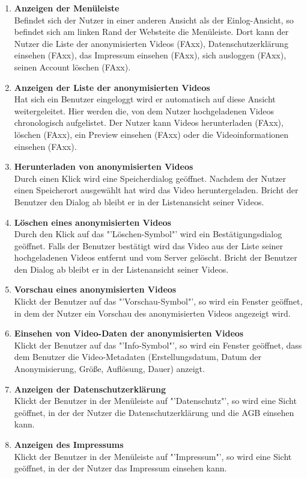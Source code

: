 \begin{enumerate}[\bfseries{FA}10]
\item \textbf{Anzeigen der Menüleiste} \hfill \\
Befindet sich der Nutzer in einer anderen Ansicht als der Einlog-Ansicht, so befindet sich am linken Rand der Websteite die Menüleiste. Dort kann der Nutzer die Liste der anonymisierten Videos (FAxx), Datenschutzerklärung einsehen (FAxx), das Impressum einsehen (FAxx), sich ausloggen (FAxx), seinen Account löschen (FAxx).

\item \textbf{Anzeigen der Liste der anonymisierten Videos} \hfill \\
Hat sich ein Benutzer eingeloggt wird er automatisch auf diese Ansicht weitergeleitet. Hier werden die, von dem Nutzer hochgeladenen Videos chronologisch aufgelistet. Der Nutzer kann Videos herunterladen (FAxx), löschen (FAxx), ein Preview einsehen (FAxx) oder die Videoinformationen einsehen (FAxx).

\item \textbf{Herunterladen von anonymisierten Videos} \hfill \\
Durch einen Klick wird eine Speicherdialog geöffnet. Nachdem der Nutzer einen Speicherort ausgewählt hat wird das Video heruntergeladen. Bricht der Benutzer den Dialog ab bleibt er in der Listenansicht seiner Videos.

\item \textbf{Löschen eines anonymisierten Videos} \hfill \\
Durch den Klick auf das "'Löschen-Symbol"' wird ein Bestätigungsdialog geöffnet. Falls der Benutzer bestätigt wird das Video aus der Liste seiner hochgeladenen Videos entfernt und vom Server gelöscht. Bricht der Benutzer den Dialog ab bleibt er in der Listenansicht seiner Videos.

\item \textbf{Vorschau eines anonymisierten Videos} \hfill \\
Klickt der Benutzer auf das "'Vorschau-Symbol"', so wird ein Fenster geöffnet, in dem der Nutzer ein Vorschau des anonymisierten Videos angezeigt wird.

\item \textbf{Einsehen von Video-Daten der anonymisierten Videos} \hfill \\
Klickt der Benutzer auf das "'Info-Symbol"', so wird ein Fenster geöffnet, dass dem Benutzer die Video-Metadaten (Erstellungsdatum, Datum der Anonymisierung, Größe, Auflösung, Dauer) anzeigt.

\item \textbf{Anzeigen der Datenschutzerklärung} \hfill \\
Klickt der Benutzer in der Menüleiste auf "'Datenschutz"', so wird eine Sicht geöffnet, in der der Nutzer die Datenschutzerklärung und die AGB einsehen kann.

\item \textbf{Anzeigen des Impressums} \hfill \\
Klickt der Benutzer in der Menüleiste auf "'Impressum"', so wird eine Sicht geöffnet, in der der Nutzer das Impressum einsehen kann.
\end{enumerate}